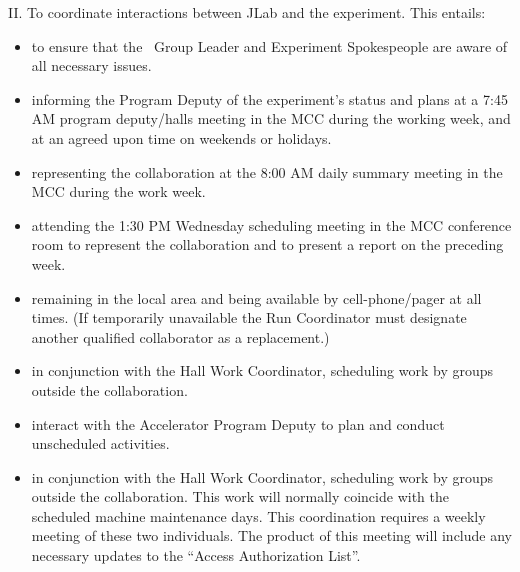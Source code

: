 \documentclass[10pt]{article}
\begin{document}
\vspace{.25cm}

\noindent II. To coordinate interactions between JLab and the experiment. This
 entails:

\begin{itemize}

\item to ensure that the \HALL\ Group Leader and Experiment
Spokespeople are  aware of all necessary issues.


\item informing the Program Deputy of the experiment's status and plans at
a 7:45 AM program deputy/halls meeting in the MCC during the working week, and at an agreed
upon time on weekends or holidays.

\item representing the collaboration at the 8:00 AM daily summary meeting in the MCC
during the work week.

\item attending the 1:30 PM Wednesday scheduling meeting in the MCC conference
room to represent the collaboration and to present a report on the
preceding week.

\item remaining in the local area and being available by cell-phone/pager
at all times.  (If temporarily unavailable the Run Coordinator must designate another
qualified collaborator as a replacement.)

\item in conjunction with the Hall Work Coordinator, scheduling work by groups
outside the collaboration.

\item interact with the Accelerator Program Deputy to plan and conduct
unscheduled activities.


\item in conjunction with the Hall Work Coordinator, scheduling
work by groups outside the collaboration. This work will
normally coincide with the scheduled  machine maintenance days.
This coordination requires a weekly meeting of these  two
individuals. The product of this meeting will include any necessary
updates to the ``Access  Authorization List''.


\end{itemize}
\end{document}
